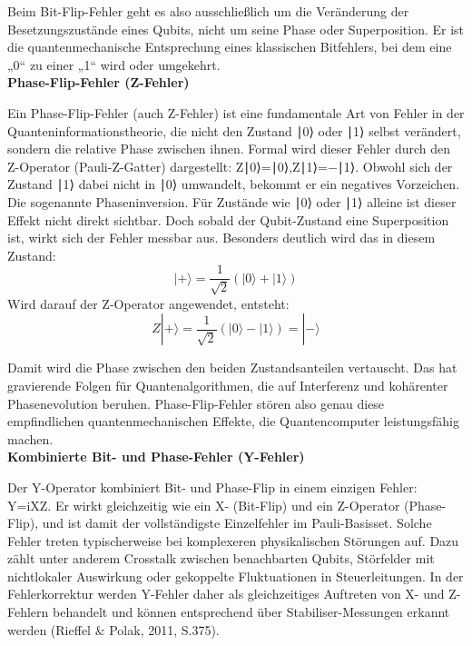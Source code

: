Beim Bit-Flip-Fehler geht es also ausschließlich um die Veränderung der Besetzungszustände eines Qubits, nicht um seine Phase oder Superposition. Er ist die quantenmechanische Entsprechung eines klassischen Bitfehlers, bei dem eine „0“ zu einer „1“ wird oder umgekehrt.  \cite[Seite 246-251]{rieffelQuantumComputingGentle2011a}\\



\textbf{Phase-Flip-Fehler (Z-Fehler)}

Ein Phase-Flip-Fehler (auch Z-Fehler) ist eine fundamentale Art von Fehler in der Quanteninformationstheorie, die nicht den Zustand ∣0⟩ oder ∣1⟩ selbst verändert, sondern die relative Phase zwischen ihnen. Formal wird dieser Fehler durch den Z-Operator (Pauli-Z-Gatter) dargestellt: Z∣0⟩=∣0⟩,Z∣1⟩=−∣1⟩. Obwohl sich der Zustand ∣1⟩ dabei nicht in ∣0⟩ umwandelt, bekommt er ein negatives Vorzeichen. Die sogenannte Phaseninversion. Für Zustände wie ∣0⟩ oder ∣1⟩ alleine ist dieser Effekt nicht direkt sichtbar. Doch sobald der Qubit-Zustand eine Superposition ist, wirkt sich der Fehler messbar aus. Besonders deutlich wird das in diesem Zustand: \[
|+\rangle = \frac{1}{\sqrt{2}}(|0\rangle + |1\rangle)
\]
Wird darauf der Z-Operator angewendet, entsteht:
\[
Z|+\rangle = \frac{1}{\sqrt{2}}(|0\rangle - |1\rangle) = |-\rangle
\]

Damit wird die Phase zwischen den beiden Zustandsanteilen vertauscht. Das hat gravierende Folgen für Quantenalgorithmen, die auf Interferenz und kohärenter Phasenevolution beruhen. Phase-Flip-Fehler stören also genau diese empfindlichen quantenmechanischen Effekte, die Quantencomputer leistungsfähig machen. \cite[Seite 251-252]{rieffelQuantumComputingGentle2011a}\\


\textbf{Kombinierte Bit- und Phase-Fehler (Y-Fehler)}

Der Y-Operator kombiniert Bit- und Phase-Flip in einem einzigen Fehler: Y=iXZ. Er wirkt gleichzeitig wie ein X- (Bit-Flip) und ein Z-Operator (Phase-Flip), und ist damit der vollständigste Einzelfehler im Pauli-Basisset. Solche Fehler treten typischerweise bei komplexeren physikalischen Störungen auf. Dazu zählt unter anderem Crosstalk zwischen benachbarten Qubits, Störfelder mit nichtlokaler Auswirkung oder gekoppelte Fluktuationen in Steuerleitungen. In der Fehlerkorrektur werden Y-Fehler daher als gleichzeitiges Auftreten von X- und Z-Fehlern behandelt und können entsprechend über Stabiliser-Messungen erkannt werden (Rieffel & Polak, 2011, S.375).

